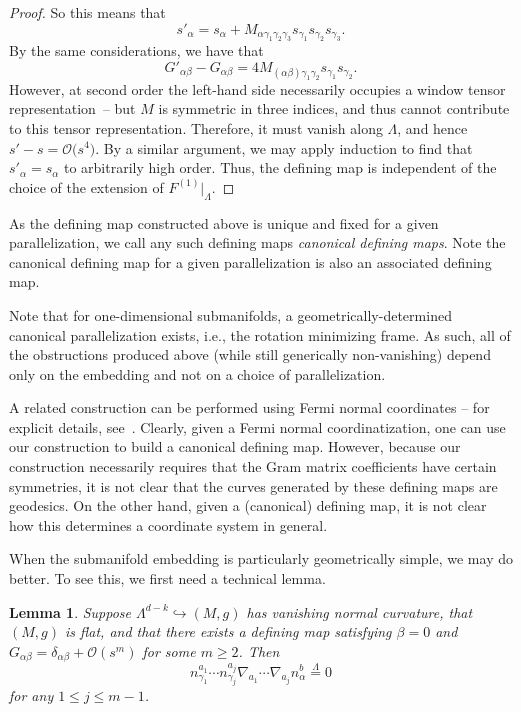 \documentclass[10pt,a4paper]{article}
\numberwithin{equation}{section}
\newtheorem{Lemma}[Theorem]{Lemma}
\renewcommand{\=}{\stackrel \Lambda =}
\begin{document}
\begin{proof}
So this means that
\[
s'_{\alpha} = s_{\alpha} + M_{\alpha \gamma_1 \gamma_2 \gamma_3} s_{\gamma_1} s_{\gamma_2} s_{\gamma_3} .
\]
By the same considerations, we have that
\[
G'_{\alpha \beta} - G_{\alpha \beta} = 4 M_{(\alpha \beta) \gamma_1 \gamma_2} s_{\gamma_1} s_{\gamma_2} .
\]
However, at second order the left-hand side necessarily occupies a window tensor representation~-- but $M$ is symmetric in three indices, and thus cannot contribute to this tensor representation. Therefore, it must vanish along $\Lambda$, and hence $s' - s = \mathcal{O}\bigl(s^4\bigr)$. By a similar argument, we may apply induction to find that $s'_{\alpha} = s_{\alpha}$ to arbitrarily high order. Thus, the defining map is independent of the choice of the extension of $F^{(1)}|_{\Lambda}$.
\end{proof}

As the defining map constructed above is unique and fixed for a given parallelization, we call any such defining maps \textit{canonical defining maps}. Note the canonical defining map for a given parallelization is also an associated defining map.

\begin{Remark} \label{curve-invariants}
Note that for one-dimensional submanifolds, a geometrically-determined canonical parallelization exists, i.e., the rotation minimizing frame. As such, all of the obstructions produced above (while still generically non-vanishing) depend only on the embedding and not on a choice of parallelization.
\end{Remark}

\begin{Remark}
A related construction can be performed using Fermi normal coordinates -- for explicit details, see~\cite{Gray,GrayBook}. Clearly, given a Fermi normal coordinatization, one can use our construction to build a canonical defining map. However, because our construction necessarily requires that the Gram matrix coefficients have certain symmetries, it is not clear that the curves generated by these defining maps are geodesics. On the other hand, given a (canonical) defining map, it is not clear how this determines a coordinate system in general.
\end{Remark}



When the submanifold embedding is particularly geometrically simple, we may do better. To see this, we first need a technical lemma.
\begin{Lemma} \label{lower-order-derivs}
Suppose $\Lambda^{d-k} \hookrightarrow (M,g)$ has vanishing normal curvature, that $(M,g)$ is flat, and that there exists a defining map satisfying $\beta = 0$ and $G_{\alpha \beta} = \delta_{\alpha \beta} + \mathcal{O}(s^m)$ for some $m \geq 2$. Then
\[
n^{a_1}_{\gamma_1} \cdots n^{a_j}_{\gamma_j} \nabla_{a_1} \cdots \nabla_{a_j} n^b_{\alpha} \= 0
\]
for any $1 \leq j \leq m-1$.
\end{Lemma}
\end{document}
